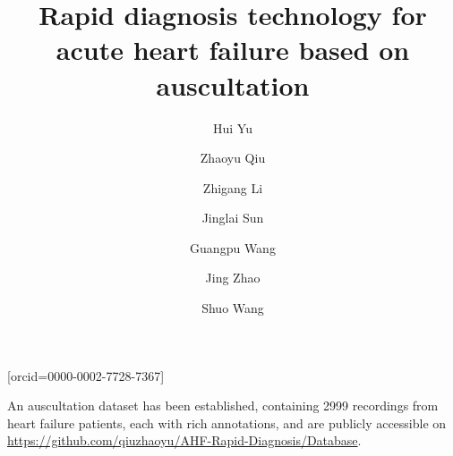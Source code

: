 \documentclass[a4paper,fleqn]{cas-dc}
\begin{document}
\sloppy
\let\WriteBookmarks\relax
\def\floatpagepagefraction{1}
\def\textpagefraction{.001}



\title [mode = title]{Rapid diagnosis technology for acute heart failure based on auscultation}                      

\author[1]{Hui Yu}
\author[1]{Zhaoyu Qiu}[orcid=0000-0002-7728-7367]
\author[2]{Zhigang Li}
\author[1]{Jinglai Sun}
\author[1]{Guangpu Wang}
\author[1]{Jing Zhao}
\cormark[1]
\author[1]{Shuo Wang}
\cormark[1]







\begin{highlights}
\item An auscultation dataset has been established, containing 2999  recordings from heart failure patients, each with rich annotations, and are publicly accessible on \href{https://github.com/qiuzhaoyu/AHF-Rapid-Diagnosis/Database}{https://github.com/qiuzhaoyu/AHF-Rapid-Diagnosis/Database}.
\end{highlights}
\end{document}
